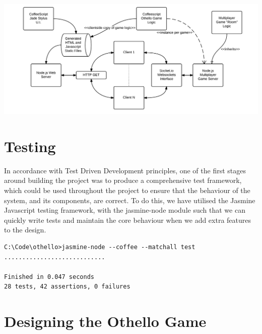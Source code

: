 \documentclass[a4wide, 11pt]{article}
\begin{document}
\includegraphics[width=\textwidth]{SoftwareEngineering.png}

\section{Testing}
In accordance with Test Driven Development principles, one of the first stages around building the project was to produce a comprehensive test framework, which could be used throughout the project to ensure that the behaviour of the system, and its components, are correct. To do this, we have utilised the Jasmine Javascript testing framework, with the jasmine-node module such that we can quickly write tests and maintain the core behaviour when we add extra features to the design.

\begin{verbatim}
C:\Code\othello>jasmine-node --coffee --matchall test
............................

Finished in 0.047 seconds
28 tests, 42 assertions, 0 failures
\end{verbatim}

\section{Designing the Othello Game}
\end{document}
